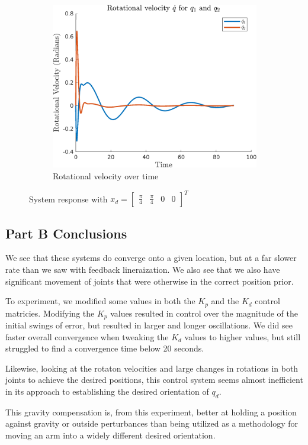 \documentclass{article}
\begin{document}
\begin{figure}[H]
\begin{subfigure}{0.325\textwidth}
        \centering
        \includegraphics[width = \textwidth]{figures/rotational-velocity-b3.png}
        \caption{Rotational velocity over time}
    \end{subfigure}
    \caption{System response with $x_d=\begin{bmatrix} \frac{\pi}{4} & \frac{\pi}{4} & 0 & 0 \end{bmatrix}^T$}
    \label{fig:b-3_results}
\end{figure}

\subsection*{Part B Conclusions}

We see that these systems do converge onto a given location, but at a far slower rate than we saw with feedback lineraization. We also see that we also have significant movement of joints that were otherwise in the correct position prior.

To experiment, we modified some values in both the $K_p$ and the $K_d$ control matricies. Modifying the $K_p$ values resulted in control over the magnitude of the initial swings of error, but resulted in larger and longer oscillations. We did see faster overall convergence when tweaking the $K_d$ values to higher values, but still struggled to find a convergence time below 20 seconds.

Likewise, looking at the rotaton velocities and large changes in rotations in both joints to achieve the desired positions, this control system seems almost inefficient in its approach to establishing the desired orientation of $q_d$.

This gravity compensation is, from this experiment, better at holding a position against gravity or outside perturbances than being utilized as a methodology for moving an arm into a widely different desired orientation.
\end{document}
